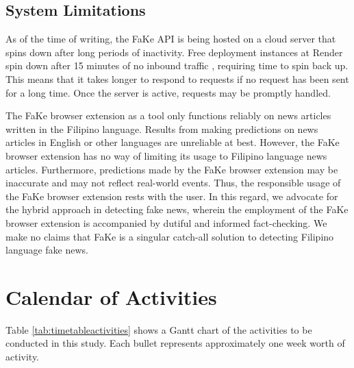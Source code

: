 \subsection{System Limitations}

As of the time of writing, the FaKe API is being hosted on a cloud server that spins down after long periods of inactivity. Free deployment instances at Render spin down after 15 minutes of no inbound traffic \cite{render-docs}, requiring time to spin back up. This means that it takes longer to respond to requests if no request has been sent for a long time. Once the server is active, requests may be promptly handled.

The FaKe browser extension as a tool only functions reliably on news articles written in the Filipino language. Results from making predictions on news articles in English or other languages are unreliable at best. However, the FaKe browser extension has no way of limiting its usage to Filipino language news articles. Furthermore, predictions made by the FaKe browser extension may be inaccurate and may not reflect real-world events. Thus, the responsible usage of the FaKe browser extension rests with the user. In this regard, we advocate for the hybrid approach in detecting fake news, wherein the employment of the FaKe browser extension is accompanied by dutiful and informed fact-checking. We make no claims that FaKe is a singular catch-all solution to detecting Filipino language fake news.

\section{Calendar of Activities}

Table \ref{tab:timetableactivities} shows a Gantt chart of the activities to be conducted in this study.  Each bullet represents approximately one week worth of activity.

%
%
\newcommand{\weekone}{\textbullet}
\newcommand{\weektwo}{\textbullet \textbullet}
\newcommand{\weekthree}{\textbullet \textbullet \textbullet}
\newcommand{\weekfour}{\textbullet \textbullet \textbullet \textbullet}

%
%

